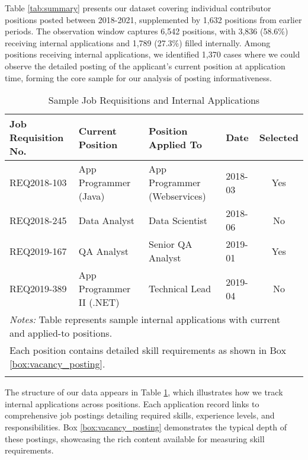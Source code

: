 Table \ref{tab:summary} presents our dataset covering individual contributor positions posted between 2018-2021, 
supplemented by 1,632 positions from earlier periods. The observation window captures 6,542 positions, with 
3,836 (58.6\%) receiving internal applications and 1,789 (27.3\%) filled internally. Among positions receiving 
internal applications, we identified 1,370 cases where we could observe the detailed posting of the applicant's 
current position at application time, forming the core sample for our analysis of posting informativeness.

\begin{table}[t]
   \caption{Sample Job Requisitions and Internal Applications}
   \begin{tabular*}{\textwidth}{@{\extracolsep\fill}llllc}
   \toprule
   Job Requisition No. & Current Position & Position Applied To & Date & Selected \\
   \midrule
   REQ2018-103 & App Programmer (Java) & App Programmer (Webservices) & 2018-03 & Yes \\
   REQ2018-245 & Data Analyst & Data Scientist & 2018-06 & No \\
   REQ2019-167 & QA Analyst & Senior QA Analyst & 2019-01 & Yes \\
   REQ2019-389 & App Programmer II (.NET) & Technical Lead & 2019-04 & No \\
   \bottomrule
   \multicolumn{5}{l}{\footnotesize \textit{Notes:} Table represents sample internal applications with current and applied-to positions.} \\
   \multicolumn{5}{l}{\footnotesize Each position contains detailed skill requirements as shown in Box \ref{box:vacancy_posting}.} \\
   \label{tab:requisitions}
   \end{tabular*}
\end{table}

The structure of our data appears in Table \ref{tab:requisitions}, which illustrates how we track internal 
applications across positions. Each application record links to comprehensive job postings detailing required 
skills, experience levels, and responsibilities. Box \ref{box:vacancy_posting} demonstrates the typical depth 
of these postings, showcasing the rich content available for measuring skill requirements.

